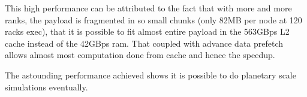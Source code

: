 \documentclass[a4paper,12 pt]{article}
\begin{document}
This high performance can be attributed to the fact that with more and more ranks, the payload is fragmented in so small chunks (only 82MB per node at 120 racks exec), that it is possible to fit almost entire payload in the 563GBps L2 cache instead of the 42GBps ram. That coupled with advance data prefetch allows almost most computation done from cache and hence the speedup.

The astounding performance achieved shows it is possible to do planetary scale simulations eventually. 
\end{document}
